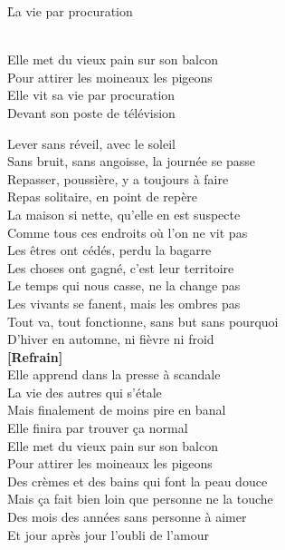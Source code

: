 \documentclass{novel}
\begin{document}
\newpage
\h*{La vie par procuration}
\normalsize
\begin{multicols}{2}
\begin{bfseries}
[Refrain:]\\
Elle met du vieux pain sur son balcon\\
Pour attirer les moineaux les pigeons\\
Elle vit sa vie par procuration\\
Devant son poste de télévision\\
\end{bfseries}

Lever sans réveil, avec le soleil\\
Sans bruit, sans angoisse, la journée se passe\\
Repasser, poussière, y a toujours à faire\\
Repas solitaire, en point de repère\\

La maison si nette, qu'elle en est suspecte\\
Comme tous ces endroits où l'on ne vit pas\\
Les êtres ont cédés, perdu la bagarre\\
Les choses ont gagné, c'est leur territoire\\

Le temps qui nous casse, ne la change pas\\
Les vivants se fanent, mais les ombres pas\\
Tout va, tout fonctionne, sans but sans pourquoi\\
D'hiver en automne, ni fièvre ni froid\\

\textbf{[Refrain]}\\

Elle apprend dans la presse à scandale\\
La vie des autres qui s'étale\\
Mais finalement de moins pire en banal\\
Elle finira par trouver ça normal\\

Elle met du vieux pain sur son balcon\\
Pour attirer les moineaux les pigeons\\

Des crèmes et des bains qui font la peau douce\\
Mais ça fait bien loin que personne ne la touche\\
Des mois des années sans personne à aimer\\
Et jour après jour l'oubli de l'amour\\


\end{multicols}
\end{document}
